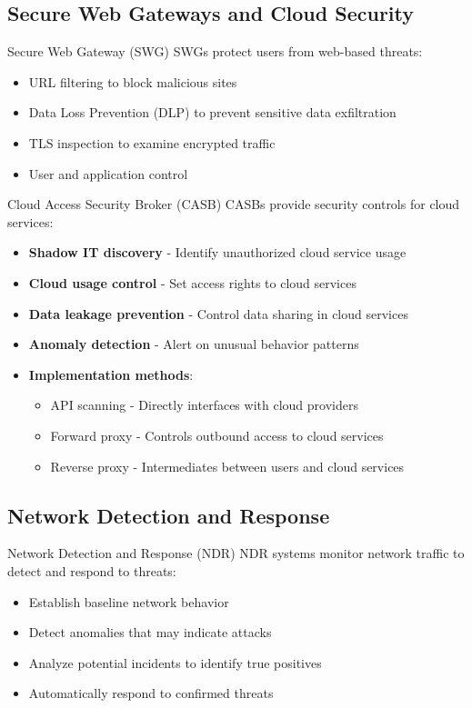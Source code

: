 \subsection{Secure Web Gateways and Cloud Security}

\begin{definition}{Secure Web Gateway (SWG)}
SWGs protect users from web-based threats:
\begin{itemize}
    \item URL filtering to block malicious sites
    \item Data Loss Prevention (DLP) to prevent sensitive data exfiltration
    \item TLS inspection to examine encrypted traffic
    \item User and application control
\end{itemize}
\end{definition}

\begin{concept}{Cloud Access Security Broker (CASB)}
CASBs provide security controls for cloud services:
\begin{itemize}
    \item \textbf{Shadow IT discovery} - Identify unauthorized cloud service usage
    \item \textbf{Cloud usage control} - Set access rights to cloud services
    \item \textbf{Data leakage prevention} - Control data sharing in cloud services
    \item \textbf{Anomaly detection} - Alert on unusual behavior patterns
    \item \textbf{Implementation methods}:
    \begin{itemize}
        \item API scanning - Directly interfaces with cloud providers
        \item Forward proxy - Controls outbound access to cloud services
        \item Reverse proxy - Intermediates between users and cloud services
    \end{itemize}
\end{itemize}
\end{concept}

\subsection{Network Detection and Response}

\begin{definition}{Network Detection and Response (NDR)}
NDR systems monitor network traffic to detect and respond to threats:
\begin{itemize}
    \item Establish baseline network behavior
    \item Detect anomalies that may indicate attacks
    \item Analyze potential incidents to identify true positives
    \item Automatically respond to confirmed threats
\end{itemize}
\end{definition}

